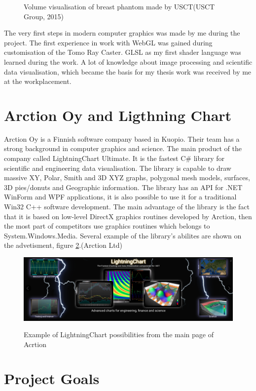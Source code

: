 \documentclass[twoside, english, 11pt]{report}
\begin{document}
\begin{figure}[!h]
\caption{Volume visualisation of breast phantom made by USCT(USCT Group, 2015)\label{fig:usct}}
\end{figure}

The very first steps in modern computer graphics was made by me during the project. The first experience in work with WebGL was gained during customisation of the Tomo Ray Caster. GLSL as my first shader language was learned during the work. A lot of knowledge about image processing and scientific data visualisation, which became the basis for my thesis work was received by me at the workplacement.


\section{Arction Oy and Ligthning Chart}

Arction Oy is a Finnish software company based in Kuopio. Their team has a strong background in computer graphics and science. The main product of the company called LightningChart Ultimate. It is the fastest C\# library for scientific and engineering data visualisation. The library is capable to draw massive XY, Polar, Smith and 3D XYZ graphs, polygonal mesh models, surfaces, 3D pies/donuts and Geographic information. The library has an API for .NET WinForm and WPF applications, it is also possible to use it for a traditional Win32 C++ software development. The main advantage of the library is the fact that it is based on low-level DirectX graphics routines developed by Arction, then the most part of competitors use graphics routines which belongs to System.Windows.Media. Several example of the library's abilites are shown on the advetisment, figure \ref{fig:lchu}.(Arction Ltd)\\
\begin{figure}[!h]
\includegraphics[scale=0.33]{img/lchu}\\
\caption{Example of LightningChart possibilities from the main page of Acrtion\label{fig:lchu}}
\end{figure}


\section{Project Goals}
\end{document}
